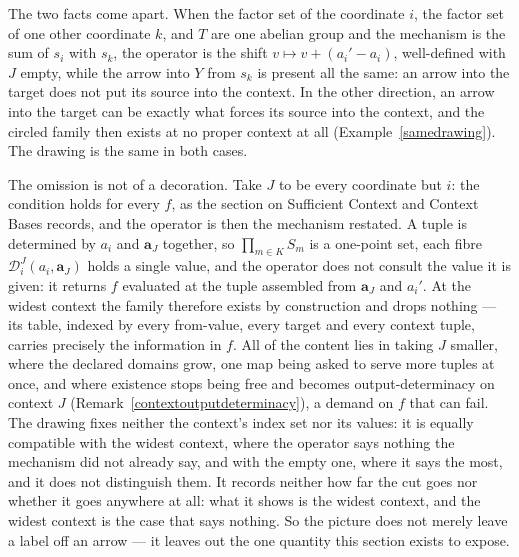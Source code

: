 \documentclass{article}
\theoremstyle{definition}
\theoremstyle{remark}
\begin{document}
The two facts come apart. When the factor set of the coordinate $i$, the factor set of one other coordinate $k$, and $T$ are one abelian group and the mechanism is the sum of $s_i$ with $s_k$, the operator is the shift $v \mapsto v + (a_i' - a_i)$, well-defined with $J$ empty, while the arrow into $Y$ from $s_k$ is present all the same: an arrow into the target does not put its source into the context. In the other direction, an arrow into the target can be exactly what forces its source into the context, and the circled family then exists at no proper context at all (Example~\ref{samedrawing}). The drawing is the same in both cases.

The omission is not of a decoration. Take $J$ to be every coordinate but $i$: the condition holds for every $f$, as the section on Sufficient Context and Context Bases records, and the operator is then the mechanism restated. A tuple is determined by $a_i$ and $\boldsymbol{a}_J$ together, so $\prod_{m \in K} S_m$ is a one-point set, each fibre $\mathcal{D}_i^J(a_i, \boldsymbol{a}_J)$ holds a single value, and the operator does not consult the value it is given: it returns $f$ evaluated at the tuple assembled from $\boldsymbol{a}_J$ and $a_i'$. At the widest context the family therefore exists by construction and drops nothing --- its table, indexed by every from-value, every target and every context tuple, carries precisely the information in $f$. All of the content lies in taking $J$ smaller, where the declared domains grow, one map being asked to serve more tuples at once, and where existence stops being free and becomes output-determinacy on context $J$ (Remark~\ref{contextoutputdeterminacy}), a demand on $f$ that can fail. The drawing fixes neither the context's index set nor its values: it is equally compatible with the widest context, where the operator says nothing the mechanism did not already say, and with the empty one, where it says the most, and it does not distinguish them. It records neither how far the cut goes nor whether it goes anywhere at all: what it shows is the widest context, and the widest context is the case that says nothing. So the picture does not merely leave a label off an arrow --- it leaves out the one quantity this section exists to expose.
\end{document}
